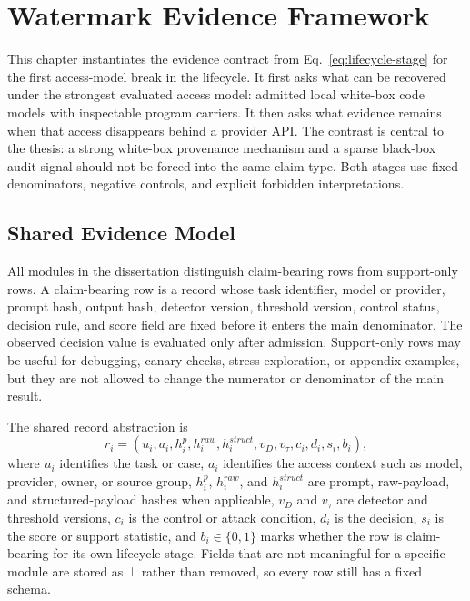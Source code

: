 \chapter{Watermark Evidence Framework}\label{cpt:evidence-framework}

This chapter instantiates the evidence contract from Eq.~\ref{eq:lifecycle-stage} for the first access-model break in the lifecycle. It first asks what can be recovered under the strongest evaluated access model: admitted local white-box code models with inspectable program carriers. It then asks what evidence remains when that access disappears behind a provider API. The contrast is central to the thesis: a strong white-box provenance mechanism and a sparse black-box audit signal should not be forced into the same claim type. Both stages use fixed denominators, negative controls, and explicit forbidden interpretations.

\section{Shared Evidence Model}

All modules in the dissertation distinguish claim-bearing rows from support-only rows. A claim-bearing row is a record whose task identifier, model or provider, prompt hash, output hash, detector version, threshold version, control status, decision rule, and score field are fixed before it enters the main denominator. The observed decision value is evaluated only after admission. Support-only rows may be useful for debugging, canary checks, stress exploration, or appendix examples, but they are not allowed to change the numerator or denominator of the main result.

The shared record abstraction is
\begin{equation}
  r_i=(u_i,a_i,h^p_i,h^{raw}_i,h^{struct}_i,v_D,v_\tau,c_i,d_i,s_i,b_i),
  \label{eq:claim-row}
\end{equation}
where $u_i$ identifies the task or case, $a_i$ identifies the access context such as model, provider, owner, or source group, $h^p_i$, $h^{raw}_i$, and $h^{struct}_i$ are prompt, raw-payload, and structured-payload hashes when applicable, $v_D$ and $v_\tau$ are detector and threshold versions, $c_i$ is the control or attack condition, $d_i$ is the decision, $s_i$ is the score or support statistic, and $b_i\in\{0,1\}$ marks whether the row is claim-bearing for its own lifecycle stage. Fields that are not meaningful for a specific module are stored as $\bot$ rather than removed, so every row still has a fixed schema.

